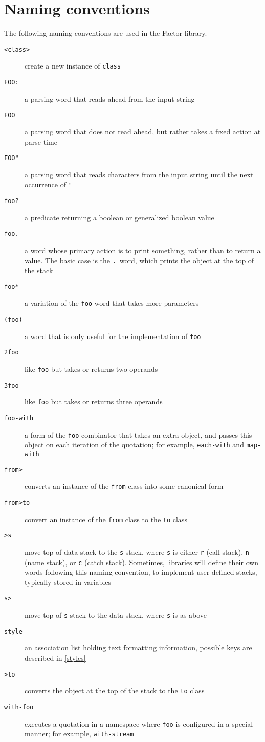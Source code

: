 \documentclass{book}
\begin{document}
\section{Naming conventions}

The following naming conventions are used in the Factor library.

\begin{description}
\item[\texttt{<class>}] create a new instance of \texttt{class}
\item[\texttt{FOO:}] a parsing word that reads ahead from the input string
\item[\texttt{FOO}] a parsing word that does not read ahead, but rather takes a fixed action at parse time
\item[\texttt{FOO"}] a parsing word that reads characters from the input string until the next occurrence of \texttt{"}
\item[\texttt{foo?}] a predicate returning a boolean or generalized boolean value
\item[\texttt{foo.}] a word whose primary action is to print something, rather than to return a value. The basic case is the \texttt{.}~word, which prints the object at the top of the stack
\item[\texttt{foo*}] a variation of the \texttt{foo} word that takes more parameters
\item[\texttt{(foo)}] a word that is only useful for the implementation of \texttt{foo}
\item[\texttt{2foo}] like \texttt{foo} but takes or returns two operands
\item[\texttt{3foo}] like \texttt{foo} but takes or returns three operands
\item[\texttt{foo-with}] a form of the \texttt{foo} combinator that takes an extra object, and passes this object on each iteration of the quotation; for example, \texttt{each-with} and \texttt{map-with}
\item[\texttt{from>}] converts an instance of the \texttt{from} class into some canonical form
\item[\texttt{from>to}] convert an instance of the \texttt{from} class to the \texttt{to} class
\item[\texttt{>s}] move top of data stack to the \texttt{s} stack, where \texttt{s} is either \texttt{r} (call stack), \texttt{n} (name stack), or \texttt{c} (catch stack). Sometimes, libraries will define their own words following this naming convention, to implement user-defined stacks, typically stored in variables
\item[\texttt{s>}] move top of \texttt{s} stack to the data stack, where \texttt{s} is as above
\item[\texttt{style}] an association list holding text formatting information, possible keys are described in \ref{styles}
\item[\texttt{>to}] converts the object at the top of the stack to the \texttt{to} class
\item[\texttt{with-foo}] executes a quotation in a namespace where \texttt{foo} is configured in a special manner; for example, \texttt{with-stream}
\end{description}
\end{document}
